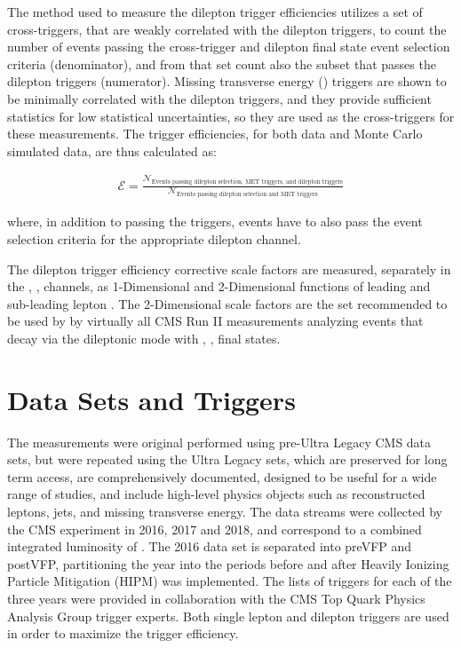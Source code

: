 The method used to measure the dilepton trigger efficiencies utilizes a set of cross-triggers, that are weakly correlated with the dilepton triggers, to count the number of events passing the cross-trigger and \ttbar dilepton final state event selection criteria (denominator), and from that set count also the subset that passes the dilepton triggers (numerator).
Missing transverse energy (\MET) triggers are shown to be minimally correlated with the dilepton triggers, and they provide sufficient statistics for low statistical uncertainties, so they are used as the cross-triggers for these measurements. 
The trigger efficiencies, for both data and Monte Carlo simulated data, are thus calculated as: 
\begin{linenomath*}
\begin{align}
\mathcal{E} = \frac{\mathcal{N}_{\text{Events passing dilepton selection, MET triggers, and dilepton triggers}}}{\mathcal{N}_{\text{Events passing dilepton selection and MET triggers}}}
\label{efficiency}
\end{align}
\end{linenomath*}
where, in addition to passing the triggers, events have to also pass the event selection criteria for the appropriate dilepton channel. 

The dilepton trigger efficiency corrective scale factors are measured, separately in the \ee, \emu, \mumu channels, as 1-Dimensional and 2-Dimensional functions of leading and sub-leading lepton \pT.
The 2-Dimensional scale factors are the set recommended to be used by by virtually all CMS Run II measurements analyzing \ttbar events that decay via the dileptonic mode with \ee, \emu, \mumu final states.

\section{Data Sets and Triggers}
The measurements were original performed using pre-Ultra Legacy CMS data sets, but were repeated using the Ultra Legacy sets, which are preserved for long term access, are comprehensively documented, designed to be useful for a wide range of studies, and include high-level physics objects such as reconstructed leptons, jets, and missing transverse energy.
The data streams were collected by the CMS experiment in 2016, 2017 and 2018, and correspond to a combined integrated luminosity of \lumivalueRuniiUL.
The 2016 data set is separated into preVFP and postVFP, partitioning the year into the periods before and after Heavily Ionizing Particle Mitigation (HIPM) was implemented.
The lists of triggers for each of the three years were provided in collaboration with the CMS Top Quark Physics Analysis Group trigger experts. 
Both single lepton and dilepton triggers are used in order to maximize the trigger efficiency. 

